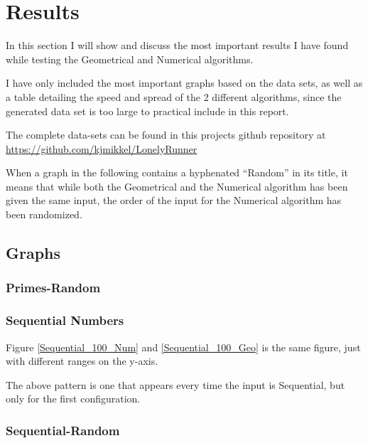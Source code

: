 \section{Results}
\label{results}
In this section I will show and discuss the most important results I have found while testing the Geometrical and Numerical algorithms. 

I have only included the most important graphs based on the data sets, as well as a table detailing the speed and spread of the 2 different algorithms, since the generated data set is too large to practical include in this report.

The complete data-sets can be found in this projects github repository at \underline{https://github.com/kjmikkel/LonelyRunner}

When a graph in the following contains a hyphenated ``Random'' in its title, it means that while both the Geometrical and the Numerical algorithm has been given the same input, the order of the input for the Numerical algorithm has been randomized. 


\subsection{Graphs}

\subsubsection{Primes-Random}

\subsubsection{Sequential Numbers}
Figure \ref{Sequential_100_Num} and \ref{Sequential_100_Geo} is the same figure, just with different ranges on the y-axis.


The above pattern is one that appears every time the input is Sequential, but only for the first configuration.

\subsubsection{Sequential-Random}


